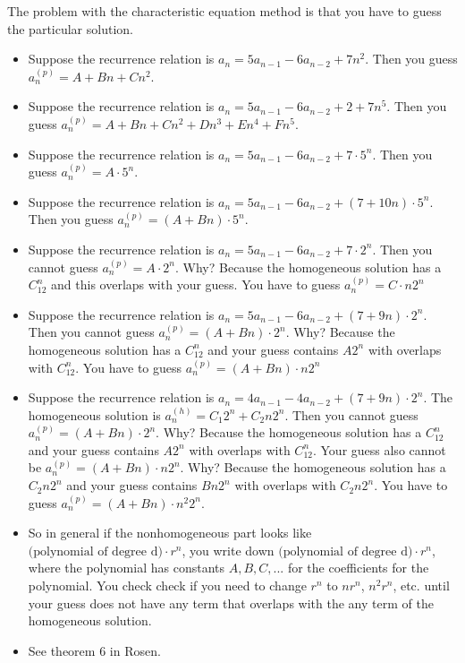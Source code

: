 The problem with the characteristic equation method is that you have to guess
the particular solution.
\begin{itemize}
\item Suppose the recurrence relation is $a_n = 5a_{n-1} - 6a_{n-2} + 7n^2$.
Then you guess $a_n^{(p)} = A + Bn + Cn^2$.

\item Suppose the recurrence relation is $a_n = 5a_{n-1} - 6a_{n-2} + 2 + 7n^5$.
Then you guess $a_n^{(p)} = A + Bn + Cn^2 + Dn^3 + En^4 + Fn^5$.

\item Suppose the recurrence relation is $a_n = 5a_{n-1} - 6a_{n-2} + 7 \cdot 5^n$.
Then you guess $a_n^{(p)} = A \cdot 5^n$.

\item Suppose the recurrence relation is $a_n = 5a_{n-1} - 6a_{n-2} + (7 + 10n) \cdot 5^n$.
Then you guess $a_n^{(p)} = (A + Bn) \cdot 5^n$.

\item Suppose the recurrence relation is $a_n = 5a_{n-1} - 6a_{n-2} + 7 \cdot 2^n$.
Then you cannot guess $a_n^{(p)} = A \cdot 2^n$. Why?
Because the homogeneous solution has a $C_12^n$ and this overlaps with your
guess.
You have to guess $a_n^{(p)} = C \cdot n2^n$

\item Suppose the recurrence relation is $a_n = 5a_{n-1} - 6a_{n-2} + (7 + 9n)\cdot 2^n$.
Then you cannot guess $a_n^{(p)} = (A + Bn) \cdot 2^n$. Why?
Because the homogeneous solution has a $C_12^n$
and your guess contains $A 2^n$ with overlaps with $C_12^n$.
You have to guess $a_n^{(p)} = (A + Bn) \cdot n2^n$

\item Suppose the recurrence relation is $a_n = 4a_{n-1} - 4a_{n-2} + (7 + 9n)\cdot 2^n$.
The homogeneous solution is $a_n^{(h)} = C_1 2^n + C_2 n2^n$.
Then you cannot guess $a_n^{(p)} = (A + Bn) \cdot 2^n$. Why?
Because the homogeneous solution has a $C_12^n$
and your guess contains $A 2^n$ with overlaps with $C_12^n$.
Your guess also cannot be $a_n^{(p)} = (A + Bn) \cdot n2^n$. Why?
Because the homogeneous solution has a $C_2 n2^n$
and your guess contains $Bn 2^n$ with overlaps with $C_2 n2^n$.
You have to guess $a_n^{(p)} = (A + Bn) \cdot n^2 2^n$.

\item So in general if the nonhomogeneous part looks like
$\text{(polynomial of degree d)} \cdot r^n$,
you write down 
$\text{(polynomial of degree d)} \cdot r^n$,
where the polynomial has constants $A,B,C,...$ for the coefficients
for the polynomial.
You check check if you need to change $r^n$ to
$nr^n$, $n^2r^n$, etc. until your guess does not have any term
that overlaps with the any term of the homogeneous solution.

\item See theorem 6 in Rosen.
\end{itemize}

